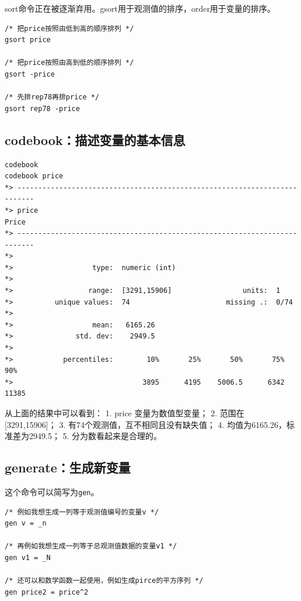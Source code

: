 \documentclass[]{ctexbook}
\begin{document}
sort命令正在被逐渐弃用。gsort用于观测值的排序，order用于变量的排序。

\begin{lstlisting}
/* 把price按照由低到高的顺序排列 */
gsort price

/* 把price按照由高到低的顺序排列 */
gsort -price

/* 先排rep78再排price */
gsort rep78 -price
\end{lstlisting}

\hypertarget{codebook}{%
\subsection{codebook：描述变量的基本信息}\label{codebook}}

\begin{lstlisting}
codebook
codebook price
*> --------------------------------------------------------------------------
*> price                                                               Price
*> --------------------------------------------------------------------------
*> 
*>                   type:  numeric (int)
*> 
*>                  range:  [3291,15906]                 units:  1
*>          unique values:  74                       missing .:  0/74
*> 
*>                   mean:   6165.26
*>               std. dev:    2949.5
*> 
*>            percentiles:        10%       25%       50%       75%       90%
*>                               3895      4195    5006.5      6342     11385
\end{lstlisting}

从上面的结果中可以看到：
1. price 变量为数值型变量；
2. 范围在 {[}3291,15906{]}；
3. 有74个观测值，互不相同且没有缺失值；
4. 均值为6165.26，标准差为2949.5；
5. 分为数看起来是合理的。

\hypertarget{generate}{%
\subsection{generate：生成新变量}\label{generate}}

这个命令可以简写为\texttt{gen}。

\begin{lstlisting}
/* 例如我想生成一列等于观测值编号的变量v */
gen v = _n

/* 再例如我想生成一列等于总观测值数据的变量v1 */
gen v1 = _N

/* 还可以和数学函数一起使用，例如生成pirce的平方序列 */
gen price2 = price^2
\end{lstlisting}
\end{document}
